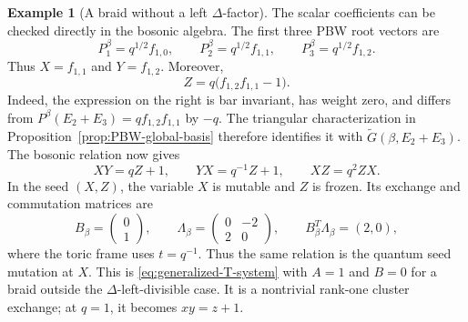 \documentclass[12pt, reqno]{amsart}
\theoremstyle{plain}
\theoremstyle{definition}
\newtheorem{example}[theorem]{Example}
\numberwithin{equation}{section}
\begin{document}
\begin{example}[A braid without a left \(\Delta\)-factor]
The scalar coefficients can be checked directly in the bosonic
algebra. The first three PBW root vectors are
\[
 P_1^\beta=q^{1/2}f_{1,0},\qquad
 P_2^\beta=q^{1/2}f_{1,1},\qquad
 P_3^\beta=q^{1/2}f_{1,2}.
\]
Thus \(X=f_{1,1}\) and \(Y=f_{1,2}\). Moreover,
\[
 Z=q\bigl(f_{1,2}f_{1,1}-1\bigr).
\]
Indeed, the expression on the right is bar invariant, has weight
zero, and differs from
\(P^\beta(E_2+E_3)=qf_{1,2}f_{1,1}\) by \(-q\).
The triangular characterization in
Proposition~\ref{prop:PBW-global-basis} therefore identifies it
with \(\widetilde G(\beta,E_2+E_3)\).
The bosonic relation now gives
\[
 \boxed{XY=qZ+1},\qquad
 YX=q^{-1}Z+1,\qquad XZ=q^2ZX.
\]
In the seed \((X,Z)\), the variable \(X\) is mutable and
\(Z\) is frozen. Its exchange and commutation matrices are
\[
 B_\beta=\begin{pmatrix}0\\1\end{pmatrix},\qquad
 \Lambda_\beta=\begin{pmatrix}0&-2\\2&0\end{pmatrix},
 \qquad B_\beta^T\Lambda_\beta=(2,0),
\]
where the toric frame uses \(t=q^{-1}\). Thus the same relation
is the quantum seed mutation at \(X\).
This is \eqref{eq:generalized-T-system} with \(A=1\) and
\(B=0\) for a braid outside the \(\Delta\)-left-divisible case.
It is a nontrivial rank-one cluster exchange; at \(q=1\), it
becomes \(xy=z+1\).
\end{example}
\end{document}
